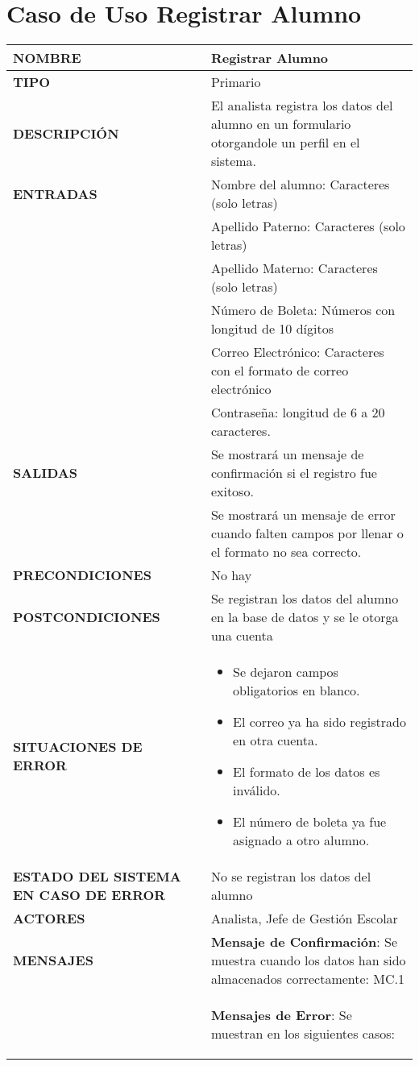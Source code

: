 \section{Caso de Uso Registrar Alumno}
\begin{longtable}{ | p{6cm} | p{10cm} |}
\hline
\textbf{NOMBRE} & Registrar Alumno\\
\hline
\textbf{TIPO} & Primario\\
\hline
\textbf{DESCRIPCIÓN} & El analista registra los datos del alumno en un formulario otorgandole un perfil en el sistema.\\
\hline
\textbf{ENTRADAS} & Nombre del alumno: Caracteres (solo letras)\\& Apellido Paterno: Caracteres (solo letras)\\& Apellido Materno: Caracteres (solo letras)\\&Número de Boleta: Números con longitud de 10 dígitos\\& Correo Electrónico: Caracteres con el formato de correo electrónico\\& Contraseña: longitud de 6 a 20 caracteres.\\
\hline
\textbf{SALIDAS} & Se mostrará un mensaje de confirmación si el registro fue exitoso.\\& Se mostrará un mensaje de error cuando falten campos por llenar o el formato no sea correcto.\\
\hline
\textbf{PRECONDICIONES} & No hay\\
\hline
\textbf{POSTCONDICIONES} & Se registran los datos del alumno en la base de datos y se le otorga una cuenta\\
\hline
\textbf{SITUACIONES DE ERROR} & \begin{itemize}
    \item Se dejaron campos obligatorios en blanco.
    \item El correo ya ha sido registrado en otra cuenta.
    \item El formato de los datos es inválido.
    \item El número de boleta ya fue asignado a otro alumno.
\end{itemize}\\
\hline
\textbf{ESTADO DEL SISTEMA EN CASO DE ERROR} & No se registran los datos del alumno\\
\hline
\textbf{ACTORES} & Analista, Jefe de Gestión Escolar\\
\hline
\textbf{MENSAJES} & \textbf{Mensaje de Confirmación}: Se muestra cuando los datos han sido almacenados correctamente: MC.1\\&\textbf{Mensajes de Error}: Se muestran en los siguientes casos:\begin{itemize}

\end{itemize}
\end{longtable}
